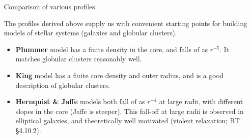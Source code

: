 \documentclass[letterpaper,landscape]{slides}
\begin{document}
\begin{slide}
\begin{center}
{\large \color{red} 
                  Comparison of various profiles  }
\end{center}

The profiles derived above supply us with convenient starting points for
building models of stellar systems (galaxies and globular clusters).

\begin{itemize}

\item {\bf Plummer} model has a finite density in the core, and falls 
of as $r^{-5}$. It matches globular clusters reasonably well.
\item {\bf King} model has a finite core density and outer radius, and is a
good description of globular clusters.
\item {\bf Hernquist \& Jaffe} models both fall of as $r^{-4}$ at large
radii, with different slopes in the core (Jaffe is steeper). This fall-off
at large radii is observed in elliptical galaxies, and theoretically well
motivated (violent relaxation; BT \S 4.10.2).

\end{itemize}

\vfill
\end{slide}
\end{document}
